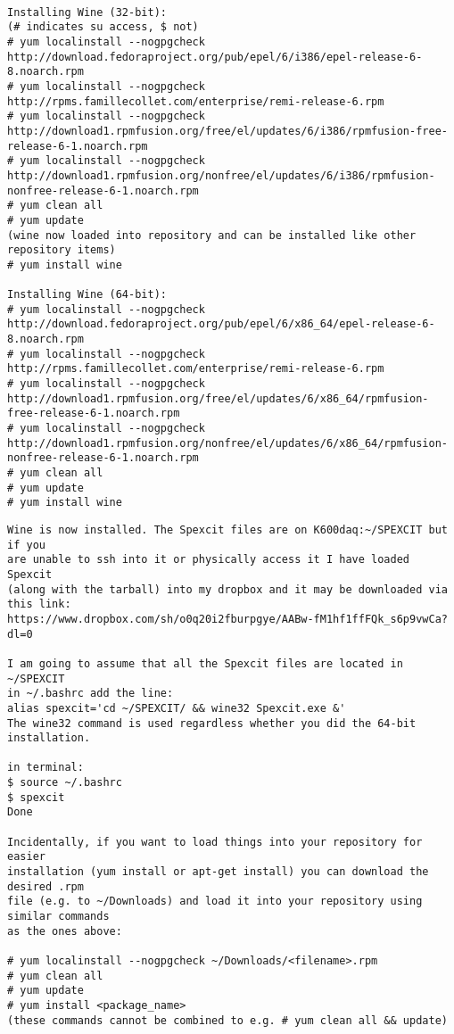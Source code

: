 \documentclass[11pt]{report}
\begin{document}
{\tiny 
\begin{verbatim}

Installing Wine (32-bit):
(# indicates su access, $ not)
# yum localinstall --nogpgcheck http://download.fedoraproject.org/pub/epel/6/i386/epel-release-6-8.noarch.rpm
# yum localinstall --nogpgcheck http://rpms.famillecollet.com/enterprise/remi-release-6.rpm
# yum localinstall --nogpgcheck http://download1.rpmfusion.org/free/el/updates/6/i386/rpmfusion-free-release-6-1.noarch.rpm
# yum localinstall --nogpgcheck http://download1.rpmfusion.org/nonfree/el/updates/6/i386/rpmfusion-nonfree-release-6-1.noarch.rpm
# yum clean all
# yum update
(wine now loaded into repository and can be installed like other repository items)
# yum install wine

Installing Wine (64-bit):
# yum localinstall --nogpgcheck http://download.fedoraproject.org/pub/epel/6/x86_64/epel-release-6-8.noarch.rpm
# yum localinstall --nogpgcheck http://rpms.famillecollet.com/enterprise/remi-release-6.rpm
# yum localinstall --nogpgcheck http://download1.rpmfusion.org/free/el/updates/6/x86_64/rpmfusion-free-release-6-1.noarch.rpm
# yum localinstall --nogpgcheck http://download1.rpmfusion.org/nonfree/el/updates/6/x86_64/rpmfusion-nonfree-release-6-1.noarch.rpm
# yum clean all
# yum update
# yum install wine
\end{verbatim}
} 

\begin{verbatim}
Wine is now installed. The Spexcit files are on K600daq:~/SPEXCIT but if you 
are unable to ssh into it or physically access it I have loaded Spexcit 
(along with the tarball) into my dropbox and it may be downloaded via this link:
https://www.dropbox.com/sh/o0q20i2fburpgye/AABw-fM1hf1ffFQk_s6p9vwCa?dl=0

I am going to assume that all the Spexcit files are located in ~/SPEXCIT
in ~/.bashrc add the line:
alias spexcit='cd ~/SPEXCIT/ && wine32 Spexcit.exe &'             
The wine32 command is used regardless whether you did the 64-bit installation.

in terminal:
$ source ~/.bashrc
$ spexcit
Done

Incidentally, if you want to load things into your repository for easier 
installation (yum install or apt-get install) you can download the desired .rpm 
file (e.g. to ~/Downloads) and load it into your repository using similar commands 
as the ones above:

# yum localinstall --nogpgcheck ~/Downloads/<filename>.rpm
# yum clean all
# yum update 
# yum install <package_name>
(these commands cannot be combined to e.g. # yum clean all && update)


\end{verbatim} 
\end{document}

